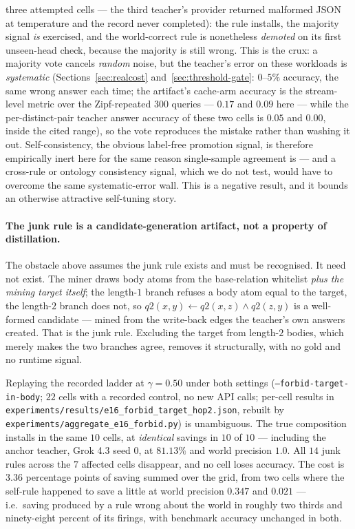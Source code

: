 \documentclass[11pt]{article}
\theoremstyle{plain}
\begin{document}
three attempted cells --- the third teacher's provider returned malformed JSON
at temperature and the record never completed): the
rule installs, the majority signal \emph{is} exercised, and the world-correct rule
is nonetheless \emph{demoted} on its first unseen-head check, because the majority
is still wrong. This is the crux: a majority vote cancels \emph{random} noise, but
the teacher's error on these workloads is \emph{systematic} (Sections~\ref{sec:realcost}
and~\ref{sec:threshold-gate}: $0$--$5\%$ accuracy, the same wrong answer each time;
the artifact's cache-arm accuracy is the stream-level metric over the
Zipf-repeated $300$ queries --- $0.17$ and $0.09$ here --- while the
per-distinct-pair teacher answer accuracy of these two cells is $0.05$ and
$0.00$, inside the cited range),
so the vote reproduces the mistake rather than washing it out. Self-consistency,
the obvious label-free promotion signal, is therefore empirically inert here for
the same reason single-sample agreement is --- and a cross-rule or ontology
consistency signal, which we do not test, would have to overcome the same
systematic-error wall. This is a negative result, and it bounds an otherwise
attractive self-tuning story.

\paragraph{The junk rule is a candidate-generation artifact, not a property of
distillation.} The obstacle above assumes the junk rule exists and must be
recognised. It need not exist. The miner draws body atoms from the base-relation
whitelist \emph{plus the mining target itself}; the length-$1$ branch refuses a
body atom equal to the target, the length-$2$ branch does not, so
$q2(x,y)\!\leftarrow\!q2(x,z)\wedge q2(z,y)$ is a well-formed candidate --- mined
from the write-back edges the teacher's own answers created. That is the junk
rule. Excluding the target from length-$2$ bodies, which merely makes the two
branches agree, removes it structurally, with no gold and no runtime signal.

Replaying the recorded ladder at $\gamma{=}0.50$ under both settings
(\texttt{--forbid-target-in-body}; $22$ cells with a recorded control, no new API
calls; per-cell results in
\texttt{experiments/results/e16\_forbid\_target\_hop2.json}, rebuilt by
\texttt{experiments/aggregate\_e16\_forbid.py}) is unambiguous. The true
composition installs in the same $10$ cells, at
\emph{identical} savings in $10$ of $10$ --- including the anchor teacher, Grok
4.3 seed $0$, at $81.13\%$ and world precision $1.0$. All $14$ junk rules across
the $7$ affected cells disappear, and no cell loses accuracy. The cost is
$3.36$ percentage points of saving summed over the grid, from two cells where the
self-rule happened to save a little at world precision $0.347$ and $0.021$ --- i.e.\
saving produced by a rule wrong about the world in roughly two thirds and
ninety-eight percent of its firings, with benchmark accuracy unchanged in both.
\end{document}
